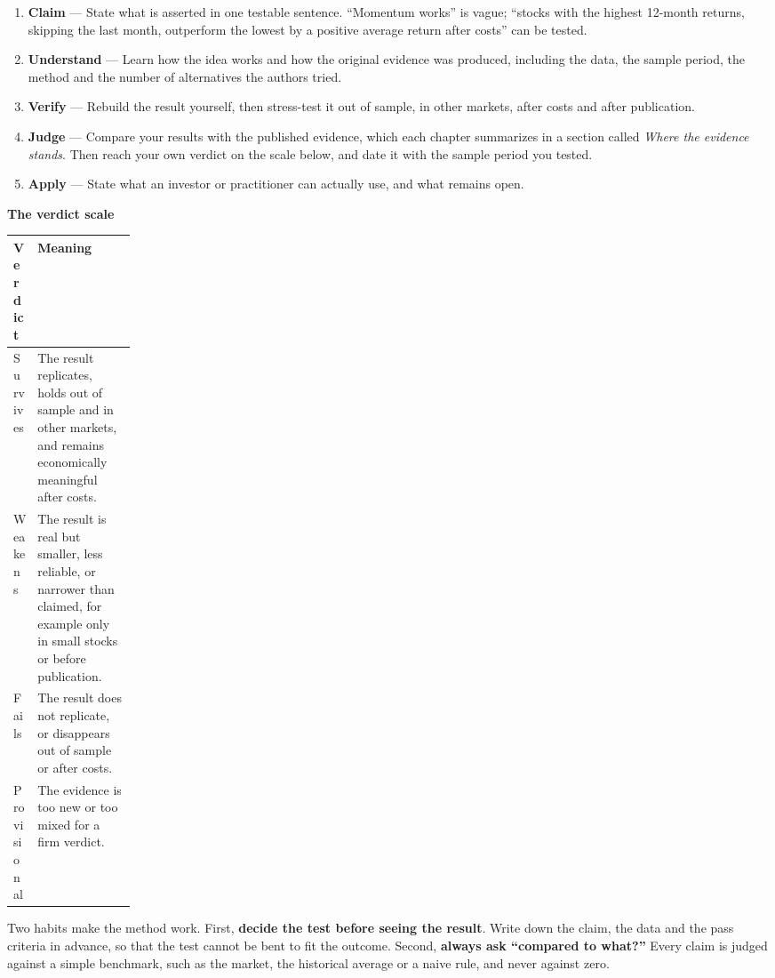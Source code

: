 \begin{enumerate}
  \item \textbf{Claim} --- State what is asserted in one testable sentence. ``Momentum works'' is vague; ``stocks with the highest 12-month returns, skipping the last month, outperform the lowest by a positive average return after costs'' can be tested.
  \item \textbf{Understand} --- Learn how the idea works and how the original evidence was produced, including the data, the sample period, the method and the number of alternatives the authors tried.
  \item \textbf{Verify} --- Rebuild the result yourself, then stress-test it out of sample, in other markets, after costs and after publication.
  \item \textbf{Judge} --- Compare your results with the published evidence, which each chapter summarizes in a section called \emph{Where the evidence stands}. Then reach your own verdict on the scale below, and date it with the sample period you tested.
  \item \textbf{Apply} --- State what an investor or practitioner can actually use, and what remains open.
\end{enumerate}

\textbf{The verdict scale}

\begin{center}
\small
\begin{tabularx}{0.9\linewidth}{@{}>{\raggedright\arraybackslash}p{0.162\linewidth}>{\raggedright\arraybackslash}X@{}}
\toprule
Verdict & Meaning \\
\midrule
Survives & The result replicates, holds out of sample and in other markets, and remains economically meaningful after costs. \\
Weakens & The result is real but smaller, less reliable, or narrower than claimed, for example only in small stocks or before publication. \\
Fails & The result does not replicate, or disappears out of sample or after costs. \\
Provisional & The evidence is too new or too mixed for a firm verdict. \\
\bottomrule
\end{tabularx}
\end{center}

Two habits make the method work. First, \textbf{decide the test before seeing the result}. Write down the claim, the data and the pass criteria in advance, so that the test cannot be bent to fit the outcome. Second, \textbf{always ask ``compared to what?''} Every claim is judged against a simple benchmark, such as the market, the historical average or a naive rule, and never against zero.

